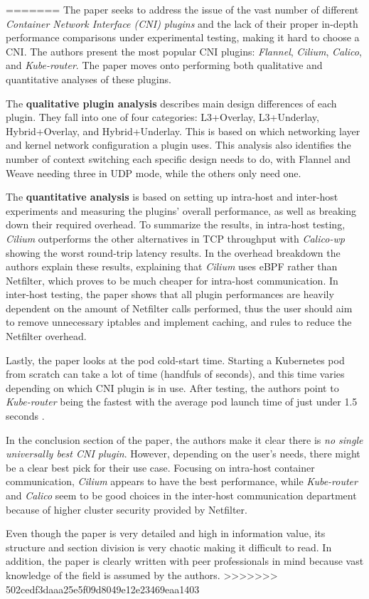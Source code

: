 =======
The paper \cite{C1} seeks to address the issue of the vast number of different \emph{Container Network Interface (CNI) plugins} and the lack of their proper in-depth performance comparisons under experimental testing, making it hard to choose a CNI. The authors present the most popular CNI plugins: \textit{Flannel}, \textit{Cilium}, \textit{Calico}, and \textit{Kube-router}. The paper moves onto performing both qualitative and quantitative analyses of these plugins.

The \textbf{qualitative plugin analysis} describes main design differences of each plugin. They fall into one of four categories: L3+Overlay, L3+Underlay, Hybrid+Overlay, and Hybrid+Underlay. This is based on which networking layer and kernel network configuration a plugin uses. This analysis also identifies the number of context switching each specific design needs to do, with Flannel and Weave needing three in UDP mode, while the others only need one.

The \textbf{quantitative analysis} is based on setting up intra-host and inter-host experiments and measuring the plugins' overall performance, as well as breaking down their required overhead. To summarize the results, in intra-host testing, \textit{Cilium} outperforms the other alternatives in TCP throughput with \textit{Calico-wp} showing the worst round-trip latency results. In the overhead breakdown the authors explain these results, explaining that \textit{Cilium} uses eBPF rather than Netfilter, which proves to be much cheaper for intra-host communication. In inter-host testing, the paper shows that all plugin performances are heavily dependent on the amount of Netfilter calls performed, thus the user should aim to remove unnecessary iptables and implement caching, and rules to reduce the Netfilter overhead.

Lastly, the paper looks at the pod cold-start time. Starting a Kubernetes pod from scratch can take a lot of time (handfuls of seconds), and this time varies depending on which CNI plugin is in use. After testing, the authors point to \textit{Kube-router} being the fastest with the average pod launch time of just under 1.5 seconds \cite{C1}.

In the conclusion section of the paper, the authors make it clear there is \emph{no single universally best CNI plugin}. However, depending on the user's needs, there might be a clear best pick for their use case. Focusing on intra-host container communication, \textit{Cilium} appears to have the best performance, while \textit{Kube-router} and \textit{Calico} seem to be good choices in the inter-host communication department because of higher cluster security provided by Netfilter.

Even though the paper is very detailed and high in information value, its structure and section division is very chaotic making it difficult to read. In addition, the paper is clearly written with peer professionals in mind because vast knowledge of the field is assumed by the authors.
>>>>>>> 502cedf3daaa25e5f09d8049e12e23469eaa1403
